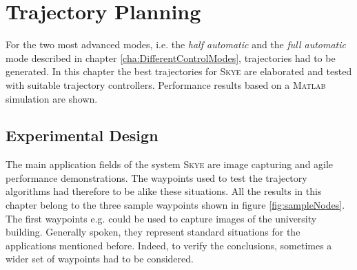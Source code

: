 \graphicspath{{graphics/}{graphics/controller/}}

\chapter{Trajectory Planning}
\label{cha:trajectory}
For the two most advanced modes, i.e. the \textit{half automatic} and the \textit{full automatic} mode described in chapter \ref{cha:DifferentControlModes}, trajectories had to be generated. In this chapter the best trajectories for \textsc{Skye} are elaborated and tested with suitable trajectory controllers. Performance results based on a \textsc{Matlab} simulation are shown.


\section{Experimental Design}
\label{sec:experimental design}
The main application fields of the system \textsc{Skye} are image capturing and agile performance demonstrations. The waypoints used to test the trajectory algorithms had therefore to be alike these situations. All the results in this chapter belong to the three sample waypoints shown in figure \ref{fig:sampleNodes}. The first waypoints e.g. could be used to capture images of the university building. Generally spoken, they represent standard situations for the applications mentioned before. Indeed, to verify the conclusions, sometimes a wider set of waypoints had to be considered. 

